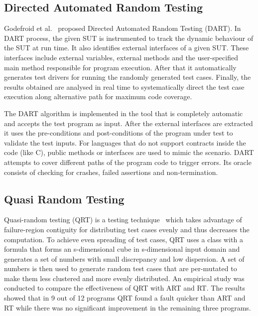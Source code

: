 \subsection{Directed Automated Random Testing}
Godefroid et al.~\cite{godefroid2005dart} proposed Directed Automated Random Testing (DART). %
In DART process, the given SUT is instrumented to track the dynamic behaviour of the SUT at run time. It also identifies external interfaces of a given SUT. These interfaces include external variables, external methods and the user-specified main method responsible for program execution. After that it automatically generates test drivers for running the randomly generated test cases. Finally, the results obtained are analysed in real time to systematically direct the test case execution along alternative path for maximum code coverage. 

The DART algorithm is implemented in the tool that is completely automatic and accepts the test program as input. After the external interfaces are extracted it uses the pre-conditions and post-conditions of the program under test to validate the test inputs. For languages that do not support contracts inside the code (like C), public methods or interfaces are used to mimic the scenario. DART attempts to cover different paths of the program code to trigger errors. Its oracle consists of checking for crashes, failed assertions and non-termination.



\subsection{Quasi Random Testing}
Quasi-random testing (QRT) is a testing technique~\cite{chen2007quasi} which takes advantage of failure-region contiguity for distributing test cases evenly and thus decreases the computation. %
To achieve even spreading of test cases, QRT uses a class with a formula that forms an s-dimensional cube in s-dimensional input domain and generates a set of numbers with small discrepancy and low dispersion. A set of numbers is then used to generate random test cases that are per-mutated to make them less clustered and more evenly distributed. An empirical study was conducted to compare the effectiveness of QRT with ART and RT. The results showed that in 9 out of 12 programs QRT found a fault quicker than ART and RT while there was no significant improvement in the remaining three programs.

